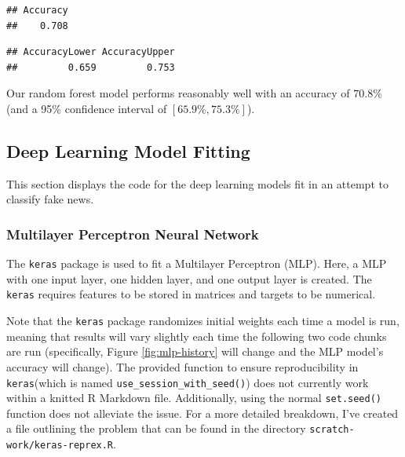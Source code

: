 \documentclass[12pt]{article}
\newenvironment{Shaded}{\begin{snugshade}}{\end{snugshade}}
\newcommand{\CommentTok}[1]{\textcolor[rgb]{0.56,0.35,0.01}{\textit{#1}}}
\newcommand{\DecValTok}[1]{\textcolor[rgb]{0.00,0.00,0.81}{#1}}
\newcommand{\KeywordTok}[1]{\textcolor[rgb]{0.13,0.29,0.53}{\textbf{#1}}}
\newcommand{\NormalTok}[1]{#1}
\newcommand{\OperatorTok}[1]{\textcolor[rgb]{0.81,0.36,0.00}{\textbf{#1}}}
\begin{document}
\begin{verbatim}
## Accuracy 
##    0.708
\end{verbatim}

\begin{Shaded}
\end{Shaded}

\begin{verbatim}
## AccuracyLower AccuracyUpper 
##         0.659         0.753
\end{verbatim}

Our random forest model performs reasonably well with an accuracy of
\(70.8\%\) (and a 95\% confidence interval of \([65.9\%, 75.3\%]\)).

\newpage

\hypertarget{deep-learning-model-fitting}{%
\subsection{Deep Learning Model
Fitting}\label{deep-learning-model-fitting}}

\label{sec:appendix-deeplearning-models}

This section displays the code for the deep learning models fit in an
attempt to classify fake news.

\hypertarget{multilayer-perceptron-neural-network}{%
\subsubsection{Multilayer Perceptron Neural
Network}\label{multilayer-perceptron-neural-network}}

The \texttt{keras} package is used to fit a Multilayer Perceptron (MLP).
Here, a MLP with one input layer, one hidden layer, and one output layer
is created. The \texttt{keras} requires features to be stored in
matrices and targets to be numerical.

Note that the \texttt{keras} package randomizes initial weights each
time a model is run, meaning that results will vary slightly each time
the following two code chunks are run (specifically, Figure
\ref{fig:mlp-history} will change and the MLP model's accuracy will
change). The provided function to ensure reproducibility in
\texttt{keras}(which is named \texttt{use\_session\_with\_seed()}) does
not currently work within a knitted R Markdown file. Additionally, using
the normal \texttt{set.seed()} function does not alleviate the issue.
For a more detailed breakdown, I've created a file outlining the problem
that can be found in the directory \texttt{scratch-work/keras-reprex.R}.
\end{document}
